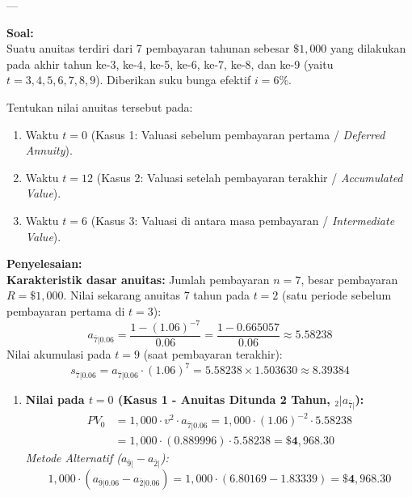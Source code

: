 \documentclass[11pt,a4paper]{article}
\begin{document}
---

\begin{examplebox}
\textbf{Soal:}\\
Suatu anuitas terdiri dari 7 pembayaran tahunan sebesar $\$1{,}000$ yang dilakukan pada akhir tahun ke-3, ke-4, ke-5, ke-6, ke-7, ke-8, dan ke-9 (yaitu $t = 3, 4, 5, 6, 7, 8, 9$). Diberikan suku bunga efektif $i = 6\%$.

Tentukan nilai anuitas tersebut pada:
\begin{enumerate}[label=(\alph*)]
    \item Waktu $t = 0$ (Kasus 1: Valuasi sebelum pembayaran pertama / \textit{Deferred Annuity}).
    \item Waktu $t = 12$ (Kasus 2: Valuasi setelah pembayaran terakhir / \textit{Accumulated Value}).
    \item Waktu $t = 6$ (Kasus 3: Valuasi di antara masa pembayaran / \textit{Intermediate Value}).
\end{enumerate}

\vspace{0.5em}
\textbf{Penyelesaian:}\\
\textbf{Karakteristik dasar anuitas:} Jumlah pembayaran $n = 7$, besar pembayaran $R = \$1{,}000$.
Nilai sekarang anuitas 7 tahun pada $t = 2$ (satu periode sebelum pembayaran pertama di $t = 3$):
\begin{equation*}
    a_{\overline{7}|0.06} = \frac{1 - (1.06)^{-7}}{0.06} = \frac{1 - 0.665057}{0.06} \approx 5.58238
\end{equation*}
Nilai akumulasi pada $t = 9$ (saat pembayaran terakhir):
\begin{equation*}
    s_{\overline{7}|0.06} = a_{\overline{7}|0.06} \cdot (1.06)^7 = 5.58238 \times 1.503630 \approx 8.39384
\end{equation*}

\begin{enumerate}[label=(\alph*)]
    \item \textbf{Nilai pada $t = 0$ (Kasus 1 - Anuitas Ditunda 2 Tahun, ${}_2| a_{\overline{7}|}$):}
    \begin{align*}
        PV_0 &= 1{,}000 \cdot v^2 \cdot a_{\overline{7}|0.06} = 1{,}000 \cdot (1.06)^{-2} \cdot 5.58238 \\
             &= 1{,}000 \cdot (0.889996) \cdot 5.58238 = \mathbf{\$4{,}968.30}
    \end{align*}
    \textit{Metode Alternatif ($a_{\overline{9}|} - a_{\overline{2}|}$):}
    \begin{equation*}
        1{,}000 \cdot (a_{\overline{9}|0.06} - a_{\overline{2}|0.06}) = 1{,}000 \cdot (6.80169 - 1.83339) = \mathbf{\$4{,}968.30}
    \end{equation*}


\end{enumerate}
\end{examplebox}
\end{document}
